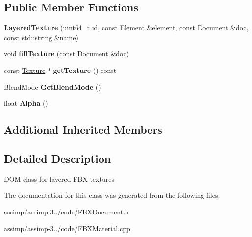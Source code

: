 \subsection*{Public Member Functions}
\begin{DoxyCompactItemize}
\item 
\hypertarget{class_assimp_1_1_f_b_x_1_1_layered_texture_afcfc866b81f81e59fc69666e54c8c1d7}{{\bfseries Layered\+Texture} (uint64\+\_\+t id, const \hyperlink{class_assimp_1_1_f_b_x_1_1_element}{Element} \&element, const \hyperlink{class_assimp_1_1_f_b_x_1_1_document}{Document} \&doc, const std\+::string \&name)}\label{class_assimp_1_1_f_b_x_1_1_layered_texture_afcfc866b81f81e59fc69666e54c8c1d7}

\item 
\hypertarget{class_assimp_1_1_f_b_x_1_1_layered_texture_a7a9d753c4aade84cd9040bdc32cdace1}{void {\bfseries fill\+Texture} (const \hyperlink{class_assimp_1_1_f_b_x_1_1_document}{Document} \&doc)}\label{class_assimp_1_1_f_b_x_1_1_layered_texture_a7a9d753c4aade84cd9040bdc32cdace1}

\item 
\hypertarget{class_assimp_1_1_f_b_x_1_1_layered_texture_a50404a223cfacb6c0a47cec119d00b0d}{const \hyperlink{class_assimp_1_1_f_b_x_1_1_texture}{Texture} $\ast$ {\bfseries get\+Texture} () const }\label{class_assimp_1_1_f_b_x_1_1_layered_texture_a50404a223cfacb6c0a47cec119d00b0d}

\item 
\hypertarget{class_assimp_1_1_f_b_x_1_1_layered_texture_a36fbd03fee4517e60fd80730fbfb7968}{Blend\+Mode {\bfseries Get\+Blend\+Mode} ()}\label{class_assimp_1_1_f_b_x_1_1_layered_texture_a36fbd03fee4517e60fd80730fbfb7968}

\item 
\hypertarget{class_assimp_1_1_f_b_x_1_1_layered_texture_a77be2e23b618fa9e24a593ba98e51590}{float {\bfseries Alpha} ()}\label{class_assimp_1_1_f_b_x_1_1_layered_texture_a77be2e23b618fa9e24a593ba98e51590}

\end{DoxyCompactItemize}
\subsection*{Additional Inherited Members}


\subsection{Detailed Description}
D\+O\+M class for layered F\+B\+X textures 

The documentation for this class was generated from the following files\+:\begin{DoxyCompactItemize}
\item 
assimp/assimp-\/3../code/\hyperlink{_f_b_x_document_8h}{F\+B\+X\+Document.\+h}\item 
assimp/assimp-\/3../code/\hyperlink{_f_b_x_material_8cpp}{F\+B\+X\+Material.\+cpp}\end{DoxyCompactItemize}
